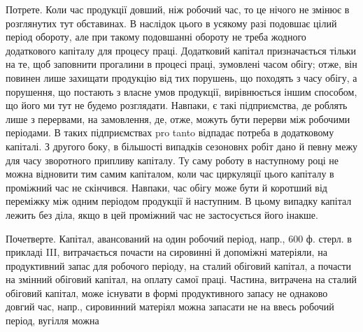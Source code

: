 Потрете. Коли час продукції довший, ніж робочий час, то це нічого
не змінює в розглянутих тут обставинах. В наслідок цього в усякому
разі подовшає цілий період обороту, але при такому подовшанні обороту
не треба жодного додаткового капіталу для процесу праці. Додатковий
капітал призначається тільки на те, щоб заповнити прогалини в процесі
праці, зумовлені часом обігу; отже, він повинен лише захищати
продукцію від тих порушень, що походять з часу обігу, а порушення,
що постають з власне умов продукції, вирівнюється іншим способом, що
його ми тут не будемо розглядати. Навпаки, є такі підприємства, де роблять
лише з перервами, на замовлення, де, отже, можуть бути перерви
між робочими періодами. В таких підприємствах pro tanto відпадає потреба
в додатковому капіталі. З другого боку, в більшості випадків сезоновнх
робіт дано й певну межу для часу зворотного припливу капіталу.
Ту саму роботу в наступному році не можна відновити тим самим капіталом,
коли час циркуляції цього капіталу в проміжний час не скінчився. Навпаки,
час обігу може бути й коротший від переміжку між одним періодом
продукції й наступним. В цьому випадку капітал лежить без діла,
якщо в цей проміжний час не застосується його інакше.

Почетверте. Капітал, авансований на один робочий період, напр.,
600 ф. стерл. в прикладі III, витрачається почасти на сировинні й допоміжні
матеріяли, на продуктивний запас для робочого періоду, на сталий обіговий
капітал, а почасти на змінний обіговий капітал, на оплату самої
праці. Частина, витрачена на сталий обіговий капітал, може існувати в
формі продуктивного запасу не однаково довгий час, напр., сировинний
матеріял можна запасати не на ввесь робочий період, вугілля можна
\parbreak{}  %
